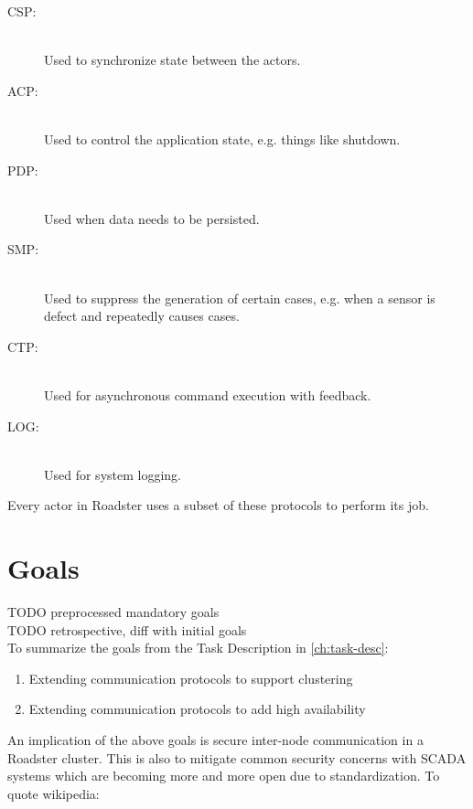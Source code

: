 \begin{description}
	\item [\gls{CSP}:]\hfill\\
		Used to synchronize state between the actors.
	\item [\gls{ACP}:]\hfill\\
		Used to control the application state, e.g. things like shutdown.
	\item [\gls{PDP}:]\hfill\\
		Used when data needs to be persisted.
	\item [\gls{SMP}:]\hfill\\
		Used to suppress the generation of certain \glspl{case}, e.g.
		when a sensor is defect and repeatedly causes cases.
	\item [\gls{CTP}:]\hfill\\
		Used for asynchronous command execution with feedback.
	\item [\gls{LOG}:]\hfill\\
		Used for system logging.
\end{description}

Every actor in Roadster uses a subset of these protocols to perform its job.

\section{Goals}
TODO preprocessed mandatory goals\\
TODO retrospective, diff with initial goals\\

To summarize the goals from the Task Description in \autoref{ch:task-desc}:

\begin{enumerate}
	\item Extending communication protocols to support clustering
	\item Extending communication protocols to add high availability
\end{enumerate}

An implication of the above goals is secure inter-node communication in a Roadster cluster. This is also to mitigate common security concerns with SCADA systems which are becoming more and more open due to standardization. To quote wikipedia:

